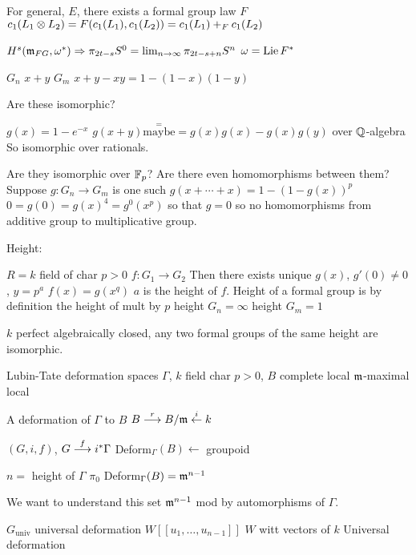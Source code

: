 \begin{thm}[Quillen]
For general, $E$, there exists a formal group law $F$
$c_1(L_1 \otimes L_2)= F(c_1(L_1),c_1(L_2))= c_1(L_1) +_F c_1(L_2)$
\end{thm}

$H^s(\mathfrak{m}_{FG}, \omega^*) \Rightarrow \pi_{2t-s}S^0= \lim_{n \to \infty} \pi_{2t-s+n} S^n$
$\omega= \operatorname{Lie} F^*$



\begin{ex}
$G_n$ $x+y$
$G_m$ $x+y-xy= 1-(1-x)(1-y)$

Are these isomorphic?

$g(x)= 1 - e^{-x}$
$g(x+y) \stackrel{=}{\text{maybe}}= g(x)g(x) - g(x)g(y)$
over $\mathbb{Q}$-algebra
So isomorphic over rationals.

Are they isomorphic over $\mathbb{F}_p$? Are there even homomorphisms between them?
Suppose $g: G_n \to G_m$ is one such
$g(x+\cdots+x)= 1-(1- g(x))^p$
$0= g(0)= g(x)^4= g^0(x^p)$ so that $g=0$ so no homomorphisms from additive group to multiplicative group. 
\end{ex}


Height: 

$R=k$ field of char $p>0$
$f: G_1 \to G_2$
Then there exists unique $g(x)$, $g'(0) \neq 0$, $y= p^a$
$f(x)= g(x^q)$
$a$ is the height of $f$.
Height of a formal group is by definition the height of mult by $p$
height $G_n= \infty$
height $G_m= 1$

\begin{thm}[Dieudonne]
$k$ perfect algebraically closed, any two formal groups of the same height are isomorphic. 
\end{thm}


Lubin-Tate deformation spaces
$\Gamma$, $k$ field char $p>0$, $B$ complete local $\mathfrak{m}$-maximal local

A deformation of $\Gamma$ to $B$ 
$B \stackrel{r}{\longrightarrow} B/\mathfrak{m} \stackrel{i}{\leftarrow} k$

$(G,i,f)$, $G \stackrel{f}{\longrightarrow} i^*\Gamma$
Deform$_\Gamma(B) \leftarrow$ groupoid

\begin{thm}[L-T]
$n=$ height of $\Gamma$
$\pi_0$ Deform$_\Gamma(B)= \mathfrak{m}^{n-1}$
\end{thm}

We want to understand this set $\mathfrak{m}^{n-1}$ mod by automorphisms of $\Gamma$.


$G_\text{univ}$ universal deformation 
$W[[u_1,\ldots,u_{n-1}]]$
$W$ witt vectors of $k$
Universal deformation


